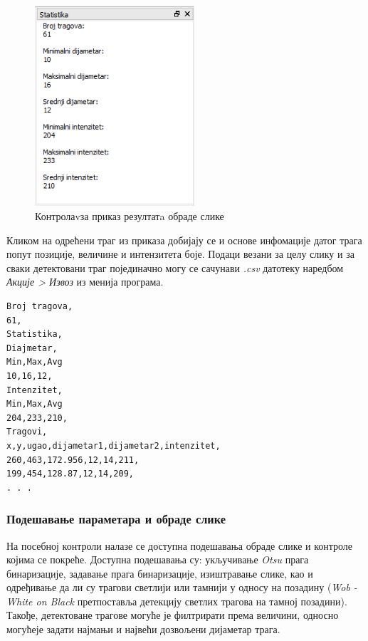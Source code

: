 \documentclass[12pt,a4paper,serbian,oneside]{book}
\begin{document}
\begin{figure}[H]
\begin{center}
\includegraphics[width=60mm]{images/stats.png}
\end{center}
\caption{Контролаvза приказ резултатa обраде слике}
\label{fig:stats}
\end{figure}

Кликом на одрећени траг из приказа добијају се и основе инфомације датог трага попут позиције, величине и интензитета боје. Подаци везани за целу слику и за сваки детектовани траг појединачно могу се сачунави \textit{.csv} датотеку наредбом \textit{Акције > Извоз} из менија програма. 

\begin{lstlisting}[language=Xml,label=lst:stats,caption=Пример сачуваних резултата]
Broj tragova,
61,
Statistika,
Diajmetar,
Min,Max,Avg
10,16,12,
Intenzitet,
Min,Max,Avg
204,233,210,
Tragovi,
x,y,ugao,dijametar1,dijametar2,intenzitet,
260,463,172.956,12,14,211,
199,454,128.87,12,14,209,
. . .
\end{lstlisting}

\subsubsection{Подешавање параметара и обраде слике}

На посебној контроли налазе се доступна подешавања обраде слике и контроле којима се покреће.
Доступна подешавања су: укључивање \textit{Otsu} прага бинаризације, задавање прага бинаризације, изиштравање слике, као и одређивање да ли су трагови светлији или тамнији у односу на позадину (\textit{Wob - White on Black} претпоставља детекцију светлих трагова на тамној позадини). Такође, детектоване трагове могуће је филтрирати према величини, односно могућеје задати најмањи и највећи дозвољени дијаметар трага. 
\end{document}
